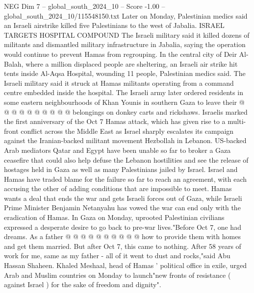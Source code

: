 \begin{textsample}{NEG Dim 7 – global\_south\_2024\_10 – Score -1.00 – global\_south\_2024\_10/115548150.txt}
Later on Monday, Palestinian medics said an Israeli airstrike killed five Palestinians to the west of Jabalia.
ISRAEL TARGETS HOSPITAL COMPOUND The Israeli military said it killed dozens of militants and dismantled military infrastructure in Jabalia, saying the operation would continue to prevent Hamas from regrouping.
In the central city of Deir Al-Balah, where a million displaced people are sheltering, an Israeli air strike hit tents inside Al-Aqsa Hospital, wounding 11 people, Palestinian medics said.
The Israeli military said it struck at Hamas militants operating from a command centre embedded inside the hospital.
The Israeli army later ordered residents in some eastern neighbourhoods of Khan Younis in southern Gaza to leave their @ @ @ @ @ @ @ @ @ @ belongings on donkey carts and rickshaws.
Israelis marked the first anniversary of the Oct 7 Hamas attack, which has given rise to a multi-front conflict across the Middle East as Israel sharply escalates its campaign against the Iranian-backed militant movement Hezbollah in Lebanon.
US-backed Arab mediators Qatar and Egypt have been unable so far to broker a Gaza ceasefire that could also help defuse the Lebanon hostilities and see the release of hostages held in Gaza as well as many Palestinians jailed by Israel.
Israel and Hamas have traded blame for the failure so far to reach an agreement, with each accusing the other of adding conditions that are impossible to meet.
Hamas wants a deal that ends the war and gets Israeli forces out of Gaza, while Israeli Prime Minister Benjamin Netanyahu has vowed the war can end only with the eradication of Hamas.
In Gaza on Monday, uprooted Palestinian civilians expressed a desperate desire to go back to pre-war lives."Before Oct 7, one had dreams.
As a father @ @ @ @ @ @ @ @ @ @ how to provide them with homes and get them married.
But after Oct 7, this came to nothing.
After 58 years of work for me, same as my father - all of it went to dust and rocks,"said Abu Hassan Shaheen.
Khaled Meshaal, head of Hamas ' political office in exile, urged Arab and Muslim countries on Monday to launch"new fronts of resistance ( against Israel ) for the sake of freedom and dignity".

\end{textsample}
